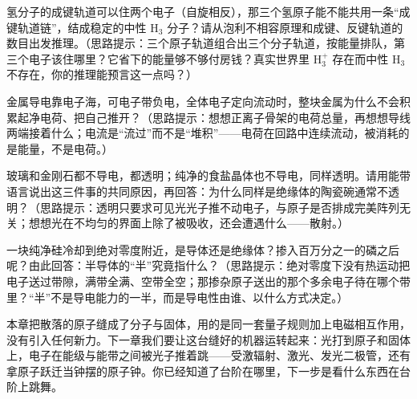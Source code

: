 \begin{puzzles}
\item 氢分子的成键轨道可以住两个电子（自旋相反），那三个氢原子能不能共用一条“成键轨道链”，结成稳定的中性 H\(_3\) 分子？请从泡利不相容原理和成键、反键轨道的数目出发推理。（思路提示：三个原子轨道组合出三个分子轨道，按能量排队，第三个电子该住哪里？它省下的能量够不够付房钱？真实世界里 H\(_3^+\) 存在而中性 H\(_3\) 不存在，你的推理能预言这一点吗？）
\item 金属导电靠电子海，可电子带负电，全体电子定向流动时，整块金属为什么不会积累起净电荷、把自己推开？（思路提示：想想正离子骨架的电荷总量，再想想导线两端接着什么；电流是“流过”而不是“堆积”——电荷在回路中连续流动，被消耗的是能量，不是电荷。）
\item 玻璃和金刚石都不导电，都透明；纯净的食盐晶体也不导电，同样透明。请用能带语言说出这三件事的共同原因，再回答：为什么同样是绝缘体的陶瓷碗通常不透明？（思路提示：透明只要求可见光光子推不动电子，与原子是否排成完美阵列无关；想想光在不均匀的界面上除了被吸收，还会遭遇什么——散射。）
\item 一块纯净硅冷却到绝对零度附近，是导体还是绝缘体？掺入百万分之一的磷之后呢？由此回答：半导体的“半”究竟指什么？（思路提示：绝对零度下没有热运动把电子送过带隙，满带全满、空带全空；那掺杂原子送出的那个多余电子待在哪个带里？“半”不是导电能力的一半，而是导电性由谁、以什么方式决定。）
\end{puzzles}

本章把散落的原子缝成了分子与固体，用的是同一套量子规则加上电磁相互作用，没有引入任何新力。下一章我们要让这台缝好的机器运转起来：光打到原子和固体上，电子在能级与能带之间被光子推着跳——受激辐射、激光、发光二极管，还有拿原子跃迁当钟摆的原子钟。你已经知道了台阶在哪里，下一步是看什么东西在台阶上跳舞。

